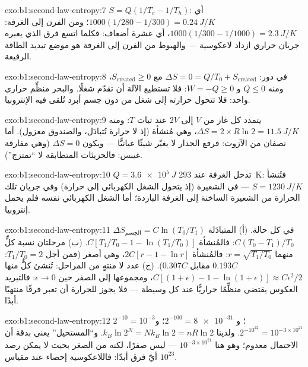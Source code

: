 \begin{solution}{exo:b1:second-law-entropy:7}
$S = Q(1/T_c - 1/T_h)$: أي $1000(1/280 - 1/300) = \qty{0.24}{J/K}$؛ ومن الفرن إلى
الغرفة: $1000(1/300 - 1/1000) = \qty{2.3}{J/K}$، أي عشرة أضعاف: فكلما اتسع
فرق  الذي يعبره جريان حراري ازداد لاعكوسية --- والهبوط
من الفرن إلى الغرفة هو موضع تبديد الطاقة الرفيعة.
\end{solution}

\begin{solution}{exo:b1:second-law-entropy:8}
في دور: $\Delta S = 0 = Q/T_0 + S_{\mathrm{created}}$ مع $S_{\mathrm{created}} \geq 0$،
ومنه $Q \leq 0$ و $W = -Q \geq 0$: فلا تستطيع الآلة أن تقدّم شغلًا. والبحر
منظِّم حراري واحد: فلا تتحول حرارته إلى شغل من دون
جسم أبرد تُلقى فيه الإنتروبيا.
\end{solution}

\begin{solution}{exo:b1:second-law-entropy:9}
يتمدد كل غاز من $V$ إلى $2V$ عند ثبات $T$: ومنه $\Delta S = 2 \times R\ln2
= \qty{11.5}{J/K}$، وهي مُنشأة (إذ لا حرارة تُتبادَل، والصندوق معزول). أما نصفان
من الآزوت: فرفع الجدار لا يغيّر شيئًا عيانيًّا ---
ويكون $\Delta S = 0$ (وهي مفارقة غيبس: فالجزيئات المتطابقة لا ``تمتزج'').
\end{solution}

\begin{solution}{exo:b1:second-law-entropy:10}
$Q = \qty{3.6e5}{J}$ تدخل الغرفة عند \qty{293}{K}: فتُنشأ $S = \qty{1230}{J/K}$
--- في الشعيرة (إذ يتحول الشغل الكهربائي إلى حرارة) وفي
جريان تلك الحرارة من الشعيرة الساخنة إلى الغرفة الباردة؛ أما الشغل
الكهربائي نفسه فلم يحمل إنتروبيا.
\end{solution}

\begin{solution}{exo:b1:second-law-entropy:11}
$\Delta S_{\text{الجسم}} = C\ln(T_0/T_1)$ في كل حالة. (أ) المتبادَلة
$C(T_0 - T_1)/T_0$: فالمُنشأة $C[T_1/T_0 - 1 - \ln(T_1/T_0)]$. (ب) مرحلتان
نسبة كلٍّ منهما $r = \sqrt{T_1/T_0}$: فالمُنشأة $2C[r - 1 - \ln r]$، وهي أصغر
(فمن أجل $T_1/T_0 = 2$: $0.193C$ مقابل $0.307C$). (ج) عدد لا منتهٍ من المراحل:
تُنشئ كلٌّ منها $C[(1 + \epsilon) - 1 - \ln(1 + \epsilon)] \approx C\epsilon^2/2$،
ومجموعها إلى الصفر حين $\epsilon \to 0$: فالتبريد العكوس يقتضي منظِّمًا حراريًّا
عند كل  وسيطة --- فلا يجوز للحرارة أن تعبر فرقًا منتهيًا أبدًا.
\end{solution}

\begin{solution}{exo:b1:second-law-entropy:12}
$2^{-10} = 10^{-3}$؛ و $2^{-100} = \num{8e-31}$؛ و $2^{-10^{22}} = 10^{-3\times10^{21}}$.
ولدينا $k_B\ln2^N = Nk_B\ln2 = nR\ln2$. و``المستحيل'' يعني بدقة أن الاحتمال
معدوم؛ وهو هنا $10^{-3\times10^{21}}$ --- ليس صفرًا، لكنه من الصغر بحيث
لا يمكن رصد أيّ فرق أبدًا: فاللاعكوسية إحصاء عند
مقياس $10^{23}$.
\end{solution}

